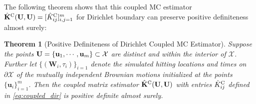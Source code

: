 \documentclass[aos,preprint]{imsart}
\theoremstyle{plain}
\newtheorem{theorem}{Theorem}[section]
\newcommand{\BU}{\bold U}
\newcommand{\Bu}{\bold u}
\theoremstyle{remark}
\begin{document}
The following theorem shows that this coupled MC estimator $\hat{\mathbf{K}}^{\rm C}(\mathbf{U},\mathbf{U}) = [\hat{K}_{ij}^{\rm C}]_{i,j=1}^m$ for Dirichlet boundary can preserve positive definiteness almost surely:
\begin{theorem}[Positive Definiteness of Dirichlet Coupled MC Estimator]
\label{thm:empirical_BdryMat_Dirichlet}
   Suppose the points \(\BU = \{\Bu_1, \cdots, \Bu_m\} \subset \mathcal{X}\) are distinct and within the interior of $\mathcal{X}$. Further let $\{(\mathbf{W}_{i},\tau_{i})\}_{i=1}$ denote the simulated hitting locations and times on $\partial \mathcal{X}$ of the mutually independent Brownian motions initialized at the points $\{\mathbf{u}_i\}_{i=1}^m$. Then the coupled matrix estimator $\hat{\mathbf{K}}^{\rm C}(\mathbf{U},\mathbf{U})$ with entries $\hat{K}_{ij}^{\rm C}$ defined in \eqref{eq:coupled_dir} is positive definite almost surely. 
\end{theorem}
\end{document}
